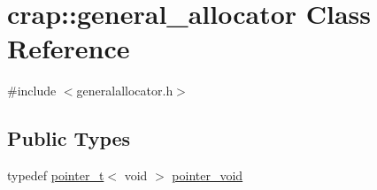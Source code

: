 \hypertarget{classcrap_1_1general__allocator}{\section{crap\+:\+:general\+\_\+allocator Class Reference}
\label{classcrap_1_1general__allocator}
}


{\ttfamily \#include $<$generalallocator.\+h$>$}

\subsection*{Public Types}
\begin{DoxyCompactItemize}
\item 
typedef \hyperlink{structcrap_1_1pointer__t}{pointer\+\_\+t}$<$ void $>$ \hyperlink{classcrap_1_1general__allocator_adc45630f82d3467f4a968e412cac88fc}{pointer\+\_\+void}
\end{DoxyCompactItemize}
